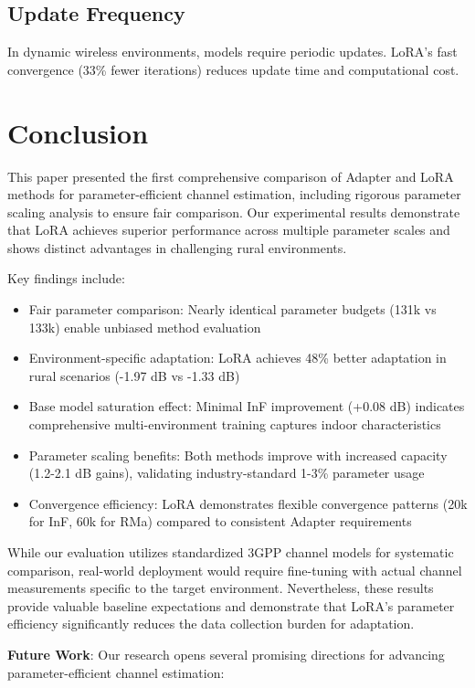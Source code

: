 \documentclass[conference]{IEEEtran}
\begin{document}
\subsection{Update Frequency}

In dynamic wireless environments, models require periodic updates. LoRA's fast convergence (33\% fewer iterations) reduces update time and computational cost.

\section{Conclusion}

This paper presented the first comprehensive comparison of Adapter and LoRA methods for parameter-efficient channel estimation, including rigorous parameter scaling analysis to ensure fair comparison. Our experimental results demonstrate that LoRA achieves superior performance across multiple parameter scales and shows distinct advantages in challenging rural environments.

Key findings include:
\begin{itemize}
\item Fair parameter comparison: Nearly identical parameter budgets (131k vs 133k) enable unbiased method evaluation
\item Environment-specific adaptation: LoRA achieves 48\% better adaptation in rural scenarios (-1.97 dB vs -1.33 dB)
\item Base model saturation effect: Minimal InF improvement (+0.08 dB) indicates comprehensive multi-environment training captures indoor characteristics
\item Parameter scaling benefits: Both methods improve with increased capacity (1.2-2.1 dB gains), validating industry-standard 1-3\% parameter usage
\item Convergence efficiency: LoRA demonstrates flexible convergence patterns (20k for InF, 60k for RMa) compared to consistent Adapter requirements
\end{itemize}

While our evaluation utilizes standardized 3GPP channel models for systematic comparison, real-world deployment would require fine-tuning with actual channel measurements specific to the target environment. Nevertheless, these results provide valuable baseline expectations and demonstrate that LoRA's parameter efficiency significantly reduces the data collection burden for adaptation.

\textbf{Future Work}: Our research opens several promising directions for advancing parameter-efficient channel estimation:
\end{document}
